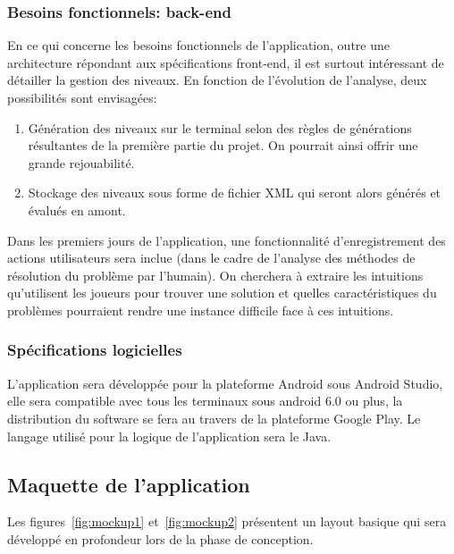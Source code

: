 \documentclass[a4paper, 11pt, titlepage]{article}
\begin{document}
\begin{appendix}
\subsubsection{Besoins fonctionnels: back-end}
	
	En ce qui concerne les besoins fonctionnels de l’application, outre une architecture répondant aux spécifications front-end, il est surtout intéressant de détailler la gestion des niveaux. En fonction de l’évolution de l’analyse, deux possibilités sont envisagées:
	\begin{enumerate}
		\item Génération des niveaux sur le terminal selon des règles de générations résultantes de la première partie du projet. On pourrait ainsi offrir une grande rejouabilité.
		\item Stockage des niveaux sous forme de fichier XML qui seront alors générés et évalués en amont.
	\end{enumerate}

	Dans les premiers jours de l'application, une fonctionnalité d'enregistrement des actions utilisateurs sera inclue (dans le cadre de l'analyse des méthodes de résolution du problème par l'humain). On cherchera à extraire les intuitions qu'utilisent les joueurs pour trouver une solution et quelles caractéristiques du problèmes pourraient rendre une instance difficile face à ces intuitions.
\subsubsection{Spécifications logicielles}
	
	L’application sera développée pour la plateforme Android sous Android Studio, elle sera compatible avec tous les terminaux sous android 6.0 ou plus, la distribution du software se fera au travers de la plateforme Google Play. Le langage utilisé pour la logique de l’application sera le Java.
\subsection{Maquette de l'application}

Les figures~\ref{fig:mockup1} et~\ref{fig:mockup2} présentent un layout basique qui sera développé en profondeur lors de la phase de conception.


\end{appendix}
\end{document}
